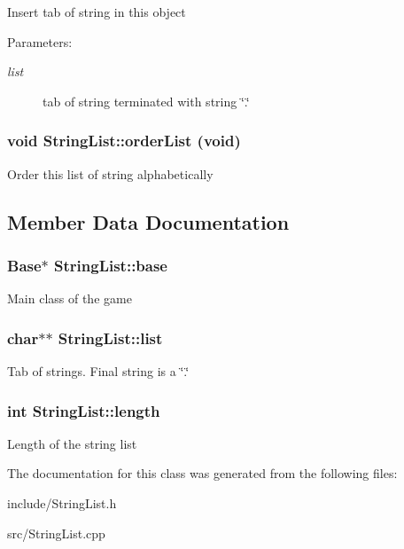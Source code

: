 Insert tab of string in this object \begin{Desc}
\item[Parameters:]
\begin{description}
\item[{\em list}]tab of string terminated with string \char`\"{}.\char`\"{} \end{description}
\end{Desc}
\subsubsection{\setlength{\rightskip}{0pt plus 5cm}void StringList::orderList (void)\hspace{0.3cm}{\tt  [protected]}}\label{classStringList_03a8b099db83f072e4a1f3bf413ad00d}


Order this list of string alphabetically 

\subsection{Member Data Documentation}
\subsubsection{\setlength{\rightskip}{0pt plus 5cm}Base$\ast$ {\bf StringList::base}\hspace{0.3cm}{\tt  [protected]}}\label{classStringList_bcabb0a7b618780433bfaf127aecd8d6}


Main class of the game 
\subsubsection{\setlength{\rightskip}{0pt plus 5cm}char$\ast$$\ast$ {\bf StringList::list}\hspace{0.3cm}{\tt  [protected]}}\label{classStringList_5e21265228e4833abd1beed2af452647}


Tab of strings. Final string is a \char`\"{}.\char`\"{} 
\subsubsection{\setlength{\rightskip}{0pt plus 5cm}int {\bf StringList::length}\hspace{0.3cm}{\tt  [protected]}}\label{classStringList_8d7fc2f13c6044b760f00e2ced19c6bc}


Length of the string list 

The documentation for this class was generated from the following files:\begin{CompactItemize}
\item 
include/StringList.h\item 
src/StringList.cpp\end{CompactItemize}
